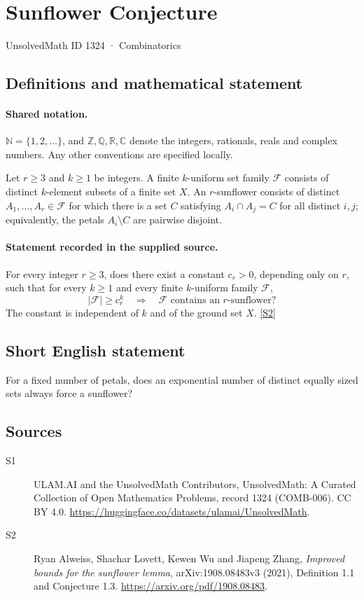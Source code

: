 \documentclass[11pt]{article}
\newcommand{\sref}[2]{\hyperlink{source:#1:#2}{[S#2]}}
\begin{document}
\setcounter{section}{1323}
\section{Sunflower Conjecture}\label{1324}
{\small\sffamily UnsolvedMath ID 1324 · Combinatorics}
\subsection{Definitions and mathematical statement}

\paragraph{Shared notation.}$\mathbb N=\{1,2,\ldots\}$, and $\mathbb Z,\mathbb Q,\mathbb R,\mathbb C$ denote the integers, rationals, reals and complex numbers. Any other conventions are specified locally.


Let $r\geq3$ and $k\geq1$ be integers. A finite $k$-uniform set family $\mathcal F$ consists of distinct $k$-element subsets of a finite set $X$. An $r$-sunflower consists of distinct $A_1,\ldots,A_r\in\mathcal F$ for which there is a set $C$ satisfying $A_i\cap A_j=C$ for all distinct $i,j$; equivalently, the petals $A_i\setminus C$ are pairwise disjoint.
\paragraph{Statement recorded in the supplied source.}
For every integer $r\geq3$, does there exist a constant $c_r>0$, depending only on $r$, such that for every $k\geq1$ and every finite $k$-uniform family $\mathcal F$,
\[
|\mathcal F|\geq c_r^k\quad\Longrightarrow\quad\mathcal F\text{ contains an }r\text{-sunflower}?
\]
The constant is independent of $k$ and of the ground set $X$. \sref{1324}{2}

\subsection{Short English statement}
For a fixed number of petals, does an exponential number of distinct equally sized sets always force a sunflower?
\subsection{Sources}
\begin{description}
\item[\hypertarget{source:1324:1}{S1}] ULAM.AI and the UnsolvedMath Contributors, UnsolvedMath: A Curated Collection of Open Mathematics Problems, record 1324 (COMB-006). CC BY 4.0. \url{https://huggingface.co/datasets/ulamai/UnsolvedMath}.
\item[\hypertarget{source:1324:2}{S2}] Ryan Alweiss, Shachar Lovett, Kewen Wu and Jiapeng Zhang, \emph{Improved bounds for the sunflower lemma}, arXiv:1908.08483v3 (2021), Definition 1.1 and Conjecture 1.3. \url{https://arxiv.org/pdf/1908.08483}.
\end{description}
\label{end:1324}
\end{document}
